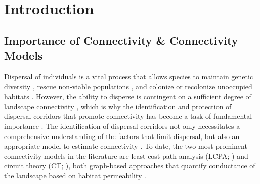 \documentclass[abstract=on,10pt,a4paper,bibliography=totocnumbered]{article}
\begin{document}
\onehalfspacing
\tableofcontents
\doublespacing

\newpage
{}


\section{Introduction}

\subsection{Importance of Connectivity \& Connectivity Models}
Dispersal of individuals is a vital process that allows species to maintain
genetic diversity \citep{Perrin.1999, Perrin.2000, Frankham.2002, Leigh.2012,
Baguette.2013}, rescue non-viable populations \citep{Brown.1977}, and colonize
or recolonize unoccupied habitats \citep{Hanski.1999b, MacArthur.2001}. However,
the ability to disperse is contingent on a sufficient degree of landscape
connectivity \citep{Fahrig.2003, Clobert.2012}, which is why the identification
and protection of dispersal corridors that promote connectivity has become a
task of fundamental importance \citep{Nathan.2008, Doerr.2011, Rudnick.2012}.
The identification of dispersal corridors not only necessitates a comprehensive
understanding of the factors that limit dispersal, but also an appropriate model
to estimate connectivity \citep{Baguette.2013, Vasudev.2015, Hofmann.2021}. To
date, the two most prominent connectivity models in the literature are
least-cost path analysis (LCPA; \citealp{Adriaensen.2003}) and circuit theory
(CT; \citealp{McRae.2006, McRae.2008}), both graph-based approaches that
quantify conductance of the landscape based on habitat permeability
\citep{Zeller.2012}.

\end{document}
